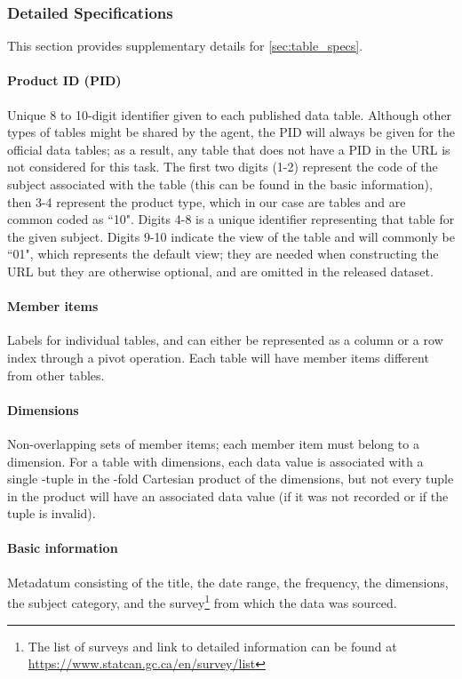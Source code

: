\documentclass[11pt]{article}
\begin{document}
\subsubsection{Detailed Specifications}
\label{sec:table_specs_supplementary}

This section provides supplementary details for \autoref{sec:table_specs}.

\paragraph{Product ID (PID)} Unique 8 to 10-digit identifier given to each published data table. Although other types of tables might be shared by the agent, the PID will always be given for the official data tables; as a result, any table that does not have a PID in the URL is not considered for this task. The first two digits (1-2) represent the code of the subject associated with the table (this can be found in the basic information), then 3-4 represent the product type, which in our case are tables and are common coded as ``10". Digits 4-8 is a unique identifier representing that table for the given subject. Digits 9-10 indicate the view of the table and will commonly be ``01", which represents the default view; they are needed when constructing the URL but they are otherwise optional, and are omitted in the released dataset.

\paragraph{Member items} Labels for individual tables, and can either be represented as a column or a row index through a pivot operation. Each table will have member items different from other tables.

\paragraph{Dimensions} Non-overlapping sets of member items; each member item must belong to a dimension. For a table with  dimensions, each data value is associated with a single -tuple in the -fold Cartesian product of the dimensions, but not every tuple in the product will have an associated data value (if it was not recorded or if the tuple is invalid).

\paragraph{Basic information} Metadatum consisting of the title, the date range, the frequency, the dimensions, the subject category, and the survey\footnote{ The list of surveys and link to detailed information can be found at \href{https://www.statcan.gc.ca/en/survey/list}{https://www.statcan.gc.ca/en/survey/list} } from which the data was sourced.
\end{document}
